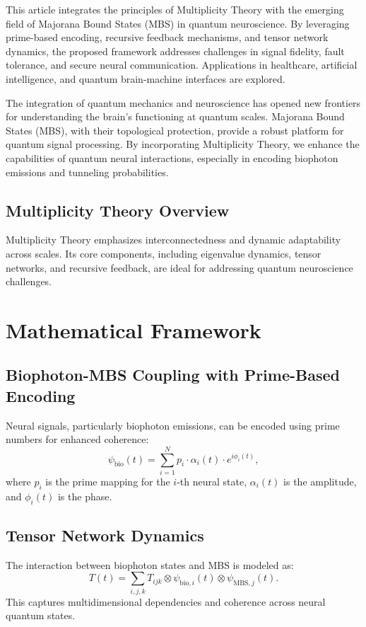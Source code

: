 \documentclass{article}
\theoremstyle{plain}
\theoremstyle{definition}
\begin{document}
This article integrates the principles of Multiplicity Theory with the emerging field of Majorana Bound States (MBS) in quantum neuroscience. By leveraging prime-based encoding, recursive feedback mechanisms, and tensor network dynamics, the proposed framework addresses challenges in signal fidelity, fault tolerance, and secure neural communication. Applications in healthcare, artificial intelligence, and quantum brain-machine interfaces are explored.

The integration of quantum mechanics and neuroscience has opened new frontiers for understanding the brain's functioning at quantum scales. Majorana Bound States (MBS), with their topological protection, provide a robust platform for quantum signal processing. By incorporating Multiplicity Theory, we enhance the capabilities of quantum neural interactions, especially in encoding biophoton emissions and tunneling probabilities.

\subsection{Multiplicity Theory Overview}
Multiplicity Theory emphasizes interconnectedness and dynamic adaptability across scales. Its core components, including eigenvalue dynamics, tensor networks, and recursive feedback, are ideal for addressing quantum neuroscience challenges.

\section{Mathematical Framework}

\subsection{Biophoton-MBS Coupling with Prime-Based Encoding}
Neural signals, particularly biophoton emissions, can be encoded using prime numbers for enhanced coherence:
\begin{equation}
\psi_{\text{bio}}(t) = \sum_{i=1}^N p_i \cdot \alpha_i(t) \cdot e^{i\phi_i(t)},
\end{equation}
where $p_i$ is the prime mapping for the $i$-th neural state, $\alpha_i(t)$ is the amplitude, and $\phi_i(t)$ is the phase.

\subsection{Tensor Network Dynamics}
The interaction between biophoton states and MBS is modeled as:
\begin{equation}
T(t) = \sum_{i,j,k} T_{ijk} \otimes \psi_{\text{bio},i}(t) \otimes \psi_{\text{MBS},j}(t).
\end{equation}
This captures multidimensional dependencies and coherence across neural quantum states.
\end{document}
